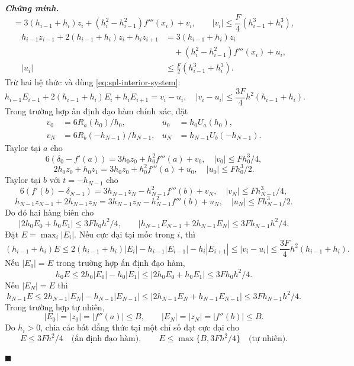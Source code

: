 \documentclass[12pt,a4paper,oneside]{book}
\numberwithin{algorithm}{chapter}
\theoremstyle{definition}
\newenvironment{chungminh}{\par\medskip\noindent\textbf{\textit{\color{mainblue}Chứng minh.}}\ }{\hfill$\blacksquare$\par\medskip}
\begin{document}
\begin{chungminh}
\[ =3(h_{i-1}+h_i)z_i+(h_i^2-h_{i-1}^2)f'''(x_i)+v_i,
 \qquad |v_i|\leq\frac F4(h_{i-1}^3+h_i^3),
\]
\begin{align*}
 h_{i-1}z_{i-1}+2(h_{i-1}+h_i)z_i+h_iz_{i+1}
 &=3(h_{i-1}+h_i)z_i\\
 &\quad+(h_i^2-h_{i-1}^2)f'''(x_i)+u_i,\\
 |u_i|&\leq\frac F2(h_{i-1}^3+h_i^3).
\end{align*}
Trừ hai hệ thức và dùng \eqref{eq:spl-interior-system}:
\[
 h_{i-1}E_{i-1}+2(h_{i-1}+h_i)E_i+h_iE_{i+1}=v_i-u_i,
 \quad |v_i-u_i|\leq\frac{3F}4h^2(h_{i-1}+h_i).
\]
Trong trường hợp ấn định đạo hàm chính xác, đặt
\begin{align*}
 v_0&=6R_a(h_0)/h_0,& u_0&=h_0U_a(h_0),\\
 v_N&=6R_b(-h_{N-1})/h_{N-1},& u_N&=h_{N-1}U_b(-h_{N-1}).
\end{align*}
Taylor tại $a$ cho
\[
 6(\delta_0-f'(a))=3h_0z_0+h_0^2f'''(a)+v_0,\quad |v_0|\leq Fh_0^3/4,
\]
\[
 2h_0z_0+h_0z_1=3h_0z_0+h_0^2f'''(a)+u_0,\quad |u_0|\leq Fh_0^3/2.
\]
Taylor tại $b$ với $t=-h_{N-1}$ cho
\[
 6(f'(b)-\delta_{N-1})=3h_{N-1}z_N-h_{N-1}^2f'''(b)+v_N,
 \quad |v_N|\leq Fh_{N-1}^3/4,
\]
\[
 h_{N-1}z_{N-1}+2h_{N-1}z_N=3h_{N-1}z_N-h_{N-1}^2f'''(b)+u_N,
 \quad |u_N|\leq Fh_{N-1}^3/2.
\]
Do đó hai hàng biên cho
\[
 |2h_0E_0+h_0E_1|\leq3Fh_0h^2/4,\qquad
 |h_{N-1}E_{N-1}+2h_{N-1}E_N|\leq3Fh_{N-1}h^2/4.
\]
Đặt $E=\max_i|E_i|$. Nếu cực đại tại mốc trong $i$, thì
\[
 (h_{i-1}+h_i)E
 \leq2(h_{i-1}+h_i)|E_i|-h_{i-1}|E_{i-1}|-h_i|E_{i+1}|
 \leq|v_i-u_i|
 \leq\frac{3F}4h^2(h_{i-1}+h_i).
\]
Nếu $|E_0|=E$ trong trường hợp ấn định đạo hàm,
\[
 h_0E
 \leq2h_0|E_0|-h_0|E_1|
 \leq|2h_0E_0+h_0E_1|
 \leq3Fh_0h^2/4.
\]
Nếu $|E_N|=E$ thì
\[
 h_{N-1}E
 \leq2h_{N-1}|E_N|-h_{N-1}|E_{N-1}|
 \leq|2h_{N-1}E_N+h_{N-1}E_{N-1}|
 \leq3Fh_{N-1}h^2/4.
\]
Trong trường hợp tự nhiên,
\[
 |E_0|=|z_0|=|f''(a)|\leq B,\qquad
 |E_N|=|z_N|=|f''(b)|\leq B.
\]
Do $h_i>0$, chia các bất đẳng thức tại một chỉ số đạt cực đại cho
\[
 E\leq3Fh^2/4\quad\text{(ấn định đạo hàm)},\qquad
 E\leq\max\{B,3Fh^2/4\}\quad\text{(tự nhiên)}.
\]


\end{chungminh}
\end{document}
